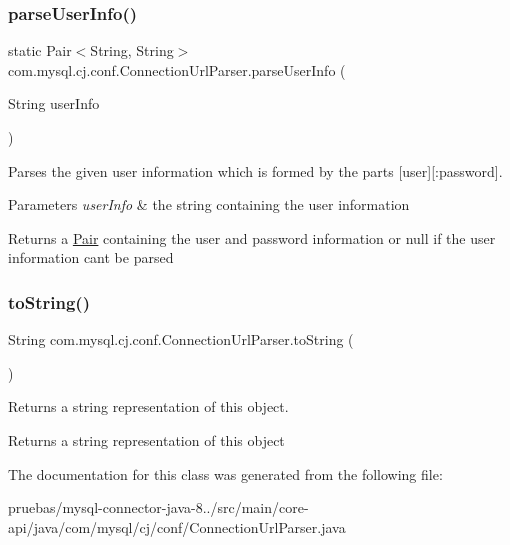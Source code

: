 \subsubsection{\texorpdfstring{parse\+User\+Info()}{parseUserInfo()}}
{\footnotesize\ttfamily static Pair$<$String, String$>$ com.\+mysql.\+cj.\+conf.\+Connection\+Url\+Parser.\+parse\+User\+Info (\begin{DoxyParamCaption}\item[{String}]{user\+Info }\end{DoxyParamCaption})\hspace{0.3cm}{\ttfamily [static]}}

Parses the given user information which is formed by the parts \mbox{[}user\mbox{]}\mbox{[}\+:password\mbox{]}.


\begin{DoxyParams}{Parameters}
{\em user\+Info} & the string containing the user information \\
\hline
\end{DoxyParams}
\begin{DoxyReturn}{Returns}
a \mbox{\hyperlink{}{Pair}} containing the user and password information or null if the user information can\textquotesingle{}t be parsed 
\end{DoxyReturn}
\mbox{\label{classcom_1_1mysql_1_1cj_1_1conf_1_1_connection_url_parser_add731ba88032454b1c17aaca658cd75e}} 
\subsubsection{\texorpdfstring{to\+String()}{toString()}}
{\footnotesize\ttfamily String com.\+mysql.\+cj.\+conf.\+Connection\+Url\+Parser.\+to\+String (\begin{DoxyParamCaption}{ }\end{DoxyParamCaption})}

Returns a string representation of this object.

\begin{DoxyReturn}{Returns}
a string representation of this object 
\end{DoxyReturn}


The documentation for this class was generated from the following file\+:\begin{DoxyCompactItemize}
\item 
pruebas/mysql-\/connector-\/java-\/8../src/main/core-\/api/java/com/mysql/cj/conf/Connection\+Url\+Parser.\+java\end{DoxyCompactItemize}
